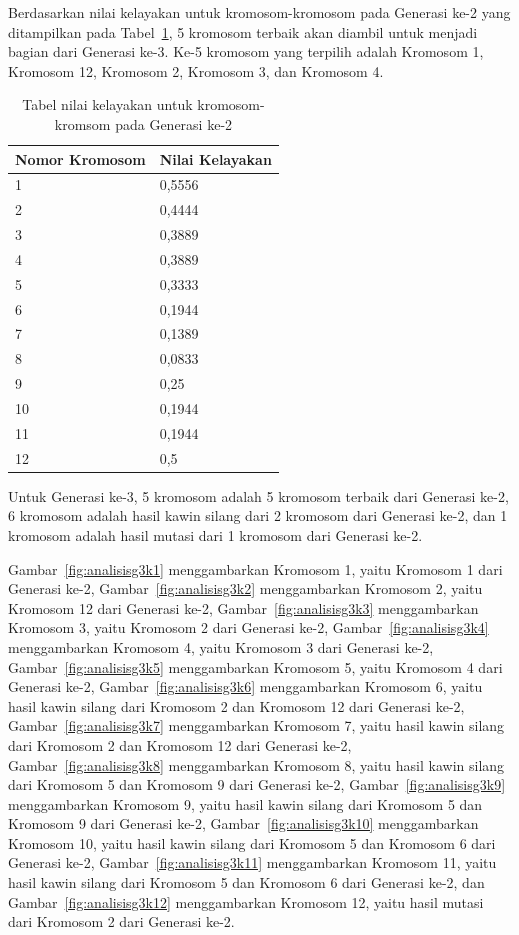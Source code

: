 \clearpage

Berdasarkan nilai kelayakan untuk kromosom-kromosom pada Generasi ke-2 yang ditampilkan pada Tabel~\ref{tab:analisishg3}, 5 kromosom terbaik akan diambil untuk menjadi bagian dari Generasi ke-3. Ke-5 kromosom yang terpilih adalah Kromosom 1, Kromosom 12, Kromosom 2, Kromosom 3, dan Kromosom 4.

\begin{table}
\centering
\captionsetup{justification=centering}
\caption[Tabel nilai kelayakan untuk kromosom-kromsom pada Generasi ke-1]{Tabel nilai kelayakan untuk kromosom-kromsom pada Generasi ke-2}
\begin{tabular}{| l | l |}
\hline
Nomor Kromosom & Nilai Kelayakan \\
\hline \hline
1 & 0,5556 \\
\hline
2 & 0,4444 \\
\hline
3 & 0,3889 \\
\hline
4 & 0,3889 \\
\hline
5 & 0,3333 \\
\hline
6 & 0,1944 \\
\hline
7 & 0,1389 \\
\hline
8 & 0,0833 \\
\hline
9 & 0,25 \\
\hline
10 & 0,1944 \\
\hline
11 & 0,1944 \\
\hline
12 & 0,5 \\
\hline
\end{tabular}
\label{tab:analisishg3}
\end{table}

Untuk Generasi ke-3, 5 kromosom adalah 5 kromosom terbaik dari Generasi ke-2, 6 kromosom adalah hasil kawin silang dari 2 kromosom dari Generasi ke-2, dan 1 kromosom adalah hasil mutasi dari 1 kromosom dari Generasi ke-2.

Gambar~\ref{fig:analisisg3k1} menggambarkan Kromosom 1, yaitu Kromosom 1 dari Generasi ke-2, Gambar~\ref{fig:analisisg3k2} menggambarkan Kromosom 2, yaitu Kromosom 12 dari Generasi ke-2, Gambar~\ref{fig:analisisg3k3} menggambarkan Kromosom 3, yaitu Kromosom 2 dari Generasi ke-2, Gambar~\ref{fig:analisisg3k4} menggambarkan Kromosom 4, yaitu Kromosom 3 dari Generasi ke-2, Gambar~\ref{fig:analisisg3k5} menggambarkan Kromosom 5, yaitu Kromosom 4 dari Generasi ke-2, Gambar~\ref{fig:analisisg3k6} menggambarkan Kromosom 6, yaitu hasil kawin silang dari Kromosom 2 dan Kromosom 12 dari Generasi ke-2, Gambar~\ref{fig:analisisg3k7} menggambarkan Kromosom 7, yaitu hasil kawin silang dari Kromosom 2 dan Kromosom 12 dari Generasi ke-2, Gambar~\ref{fig:analisisg3k8} menggambarkan Kromosom 8, yaitu hasil kawin silang dari Kromosom 5 dan Kromosom 9 dari Generasi ke-2, Gambar~\ref{fig:analisisg3k9} menggambarkan Kromosom 9, yaitu hasil kawin silang dari Kromosom 5 dan Kromosom 9 dari Generasi ke-2, Gambar~\ref{fig:analisisg3k10} menggambarkan Kromosom 10, yaitu hasil kawin silang dari Kromosom 5 dan Kromosom 6 dari Generasi ke-2, Gambar~\ref{fig:analisisg3k11} menggambarkan Kromosom 11, yaitu hasil kawin silang dari Kromosom 5 dan Kromosom 6 dari Generasi ke-2, dan Gambar~\ref{fig:analisisg3k12} menggambarkan Kromosom 12, yaitu hasil mutasi dari Kromosom 2 dari Generasi ke-2.

